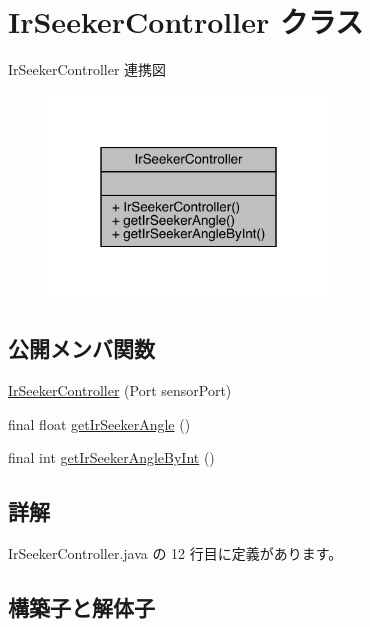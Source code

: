 \hypertarget{class_ir_seeker_controller}{}\section{Ir\+Seeker\+Controller クラス}
\label{class_ir_seeker_controller}


Ir\+Seeker\+Controller 連携図
\nopagebreak
\begin{figure}[H]
\begin{center}
\leavevmode
\includegraphics[width=211pt]{d0/d4d/class_ir_seeker_controller__coll__graph}
\end{center}
\end{figure}
\subsection*{公開メンバ関数}
\begin{DoxyCompactItemize}
\item 
\mbox{\hyperlink{class_ir_seeker_controller_a5013fb830f68f74855f46d6748af1a71}{Ir\+Seeker\+Controller}} (Port sensor\+Port)
\item 
final float \mbox{\hyperlink{class_ir_seeker_controller_a71fb9a9096eebd286ef0f02c6f603468}{get\+Ir\+Seeker\+Angle}} ()
\item 
final int \mbox{\hyperlink{class_ir_seeker_controller_ae8eeef8c000dbea552f843f8b97630e7}{get\+Ir\+Seeker\+Angle\+By\+Int}} ()
\end{DoxyCompactItemize}


\subsection{詳解}


 Ir\+Seeker\+Controller.\+java の 12 行目に定義があります。



\subsection{構築子と解体子}
\mbox{\label{class_ir_seeker_controller_a5013fb830f68f74855f46d6748af1a71}} 
